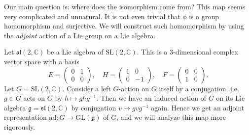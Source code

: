 \documentclass{article}
\newcommand{\SL}{\mathrm{SL}}
\newcommand{\ad}{\mathrm{ad}}
\begin{document}
Our main question is: where does the isomorphism come from? This map seems very complicated and unnatural. 
It is not even trivial that $\phi$ is a group homomorphism and surjective. 
We will construct such homomorphism by using the \emph{adjoint} action of a Lie group on a Lie algebra. 

Let $\mathfrak{sl}(2, \mathbb{C})$ be a Lie algebra of $\SL(2, \mathbb{C})$. 
This is a 3-dimensional complex vector space with a basis 
$$
E = \begin{pmatrix} 0&1\\0&0\end{pmatrix}, \quad H = \begin{pmatrix} 1&0\\0&-1\end{pmatrix}, \quad F = \begin{pmatrix} 0&0 \\ 1&0 \end{pmatrix}.
$$
Let $G = \SL(2, \mathbb{C})$. Consider a left $G$-action on $G$ itself by a conjugation, i.e. $g\in G$ acts on $G$ by $h\mapsto ghg^{-1}$. 
Then we have an induced action of $G$ on its Lie algebra $\mathfrak{g} = \mathfrak{sl}(2, \mathbb{C})$ by conjugation $v\mapsto gvg^{-1}$ again. 
Hence we get an adjoint representation $\ad:G\to \mathrm{GL}(\mathfrak{g})$ of $G$, and we will analyze this map more rigorously. 
\end{document}
